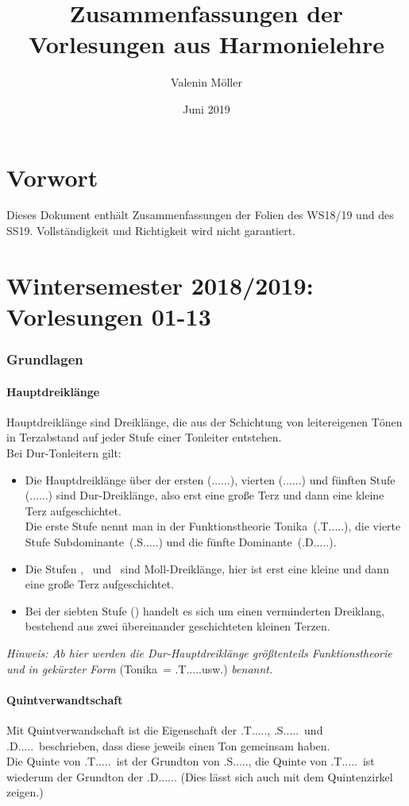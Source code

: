 \documentclass[a4paper]{article}
\title{Zusammenfassungen der Vorlesungen aus Harmonielehre}
\author{Valenin Möller}
\date{Juni 2019}
\newcommand{\dS}[1]{\HH.\uppercase\expandafter{\romannumeral #1\relax}.....} %
\newcommand{\mS}[1]{\textbf{\romannumeral #1}} %
\newcommand{\vermStufe}[1]{\textbf{\romannumeral #1\textdegree}} %
\newcommand{\T}{\HH.T.....}
\renewcommand{\S}{\HH.S.....}
\newcommand{\D}{\HH.D.....}
\begin{document}
\maketitle
\newpage
{}
\tableofcontents
\newpage
{}
	\part*{Vorwort}
	Dieses Dokument enthält Zusammenfassungen der Folien des WS18/19 und des SS19. Vollständigkeit und Richtigkeit wird nicht garantiert.
	\newpage
	\part{Wintersemester 2018/2019: Vorlesungen 01-13}
	\section{Grundlagen}
	\subsection{Hauptdreiklänge}
	Hauptdreiklänge sind Dreiklänge, die aus der Schichtung von leitereigenen Tönen in Terzabstand auf jeder Stufe einer Tonleiter entstehen.\\
	Bei Dur-Tonleitern gilt: 
	\begin{itemize}
		\item Die Hauptdreiklänge über der ersten (\dS{1}), vierten (\dS{4}) und fünften Stufe (\dS{5}) sind Dur-Dreiklänge, also erst eine große Terz und dann eine kleine Terz aufgeschichtet. \\
		Die erste Stufe nennt man in der Funktionstheorie Tonika\ (\T), die vierte Stufe Subdominante\ (\S) und die fünfte Dominante\ (\D).
		\item Die Stufen \mS{2}, \mS{3}\ und \mS{6}\ sind Moll-Dreiklänge, hier ist erst eine kleine und dann eine große Terz aufgeschichtet.
		\item Bei der siebten Stufe (\vermStufe{7}) handelt es sich um einen verminderten Dreiklang, bestehend aus zwei übereinander geschichteten kleinen Terzen.
	\end{itemize}
	\textit{Hinweis: Ab hier werden die Dur-Hauptdreiklänge größtenteils Funktionstheorie und in gekürzter Form} (Tonika\ = \T usw.) \textit{benannt.}
	\subsection{Quintverwandtschaft}
	Mit Quintverwandschaft ist die Eigenschaft der \T, \S\ und \D\ beschrieben, dass diese jeweils einen Ton gemeinsam haben.\\
	Die Quinte von \T\  ist der Grundton von \S, die Quinte von \T\ ist wiederum der Grundton der \D. (Dies lässt sich auch mit dem Quintenzirkel zeigen.)
	
\end{document}
